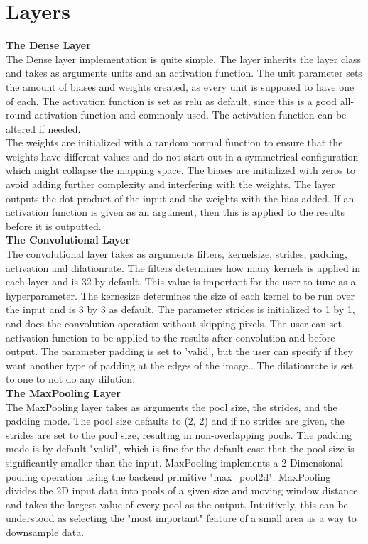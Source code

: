 \section{Layers}

\textbf{The Dense Layer}
\\
The Dense layer implementation is quite simple. The layer inherits the layer class and takes as arguments units and an activation function. The unit parameter sets the amount of biases and weights created, as every unit is supposed to have one of each.  The activation function is set as relu as default, since this is a good all-round activation function and commonly used.  The activation function can be altered if needed.  \\
The weights are initialized with a random normal function to ensure that the weights have different values and do not start out in a symmetrical configuration which might collapse the mapping space.  The biases are initialized with zeros to avoid adding further complexity and interfering with the weights. The layer outputs the dot-product of the input and the weights with the bias added. If an activation function is given as an argument, then this is applied to the results before it is outputted.
\\
\textbf{The Convolutional Layer}
\\
The convolutional layer takes as arguments filters, kernelsize, strides, padding, activation and dilationrate. The filters determines how many kernels is applied in each layer and is 32 by default. This value is important for the user to tune as a hyperparameter. The kernesize determines the size of each kernel to be run over the input and is 3 by 3 as default. The parameter strides is initialized to 1 by 1, and does the convolution operation without skipping pixels. The user can set activation function to be applied to the results after convolution and before output. The parameter padding is set to 'valid',  but the user can specify if they want another type of padding at the edges of the image.. The dilationrate is set to one to not do any dilution. 
\\
\textbf{The MaxPooling Layer}
\\
The MaxPooling layer takes as arguments the pool size, the strides, and the padding mode. The pool size defaults to (2, 2) and if no strides are given, the strides are set to the pool size, resulting in non-overlapping pools. The padding mode is by default "valid", which is fine for the default case that the pool size is significantly smaller than the input. MaxPooling implements a 2-Dimensional pooling operation using the backend primitive "max_pool2d". MaxPooling divides the 2D input data into pools of a given size and moving window distance and takes the largest value of every pool as the output. Intuitively, this can be understood as selecting the "most important" feature of a small area as a way to downsample data.
